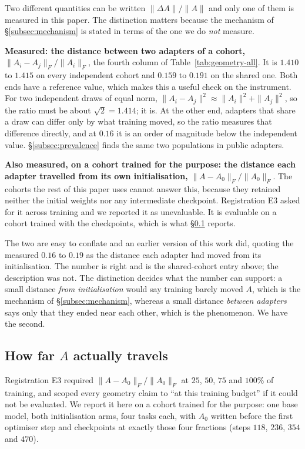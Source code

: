 Two different quantities can be written $\|\Delta A\|/\|A\|$ and only one of
them is measured in this paper. The distinction matters because the
mechanism of \S\ref{subsec:mechanism} is stated in terms of the one we do
\emph{not} measure.

\textbf{Measured: the distance between two adapters of a cohort,}
$\|A_i - A_j\|_F/\|A_i\|_F$, the fourth column of
Table~\ref{tab:geometry-all}. It is $1.410$ to $1.415$ on every independent
cohort and $0.159$ to $0.191$ on the shared one. Both ends have a reference
value, which makes this a useful check on the instrument. For two
independent draws of equal norm, $\|A_i - A_j\|^2 \approx \|A_i\|^2 +
\|A_j\|^2$, so the ratio must be about $\sqrt 2 = 1.414$; it is. At the
other end, adapters that share a draw can differ only by what training
moved, so the ratio measures that difference directly, and at $0.16$ it is
an order of magnitude below the independent value.
\S\ref{subsec:prevalence} finds the same two populations in public adapters.

\textbf{Also measured, on a cohort trained for the purpose: the distance each
adapter travelled from its own initialisation,} $\|A - A_0\|_F/\|A_0\|_F$. The
cohorts the rest of this paper uses cannot answer this, because they retained
neither the initial weights nor any intermediate checkpoint. Registration E3
asked for it across training and we reported it as unevaluable. It is
evaluable on a cohort trained with the checkpoints, which is what
\S\ref{subsec:drift-result} reports.

The two are easy to conflate and an earlier version of this work did,
quoting the measured $0.16$ to $0.19$ as the distance each adapter had moved
from its initialisation. The number is right and is the shared-cohort entry
above; the description was not. The distinction decides what the number can
support: a small distance \emph{from initialisation} would say training barely
moved $A$, which is the mechanism of \S\ref{subsec:mechanism}, whereas a small
distance \emph{between adapters} says only that they ended near each other,
which is the phenomenon. We have the second.

\subsection{How far \texorpdfstring{$A$}{A} actually travels}
\label{subsec:drift-result}

Registration E3 required $\|A - A_0\|_F/\|A_0\|_F$ at $25$, $50$, $75$ and
$100\%$ of training, and scoped every geometry claim to ``at this training
budget'' if it could not be evaluated. We report it here on a cohort trained
for the purpose: one base model, both initialisation arms, four tasks each,
with $A_0$ written before the first optimiser step and checkpoints at exactly
those four fractions (steps $118$, $236$, $354$ and $470$).

